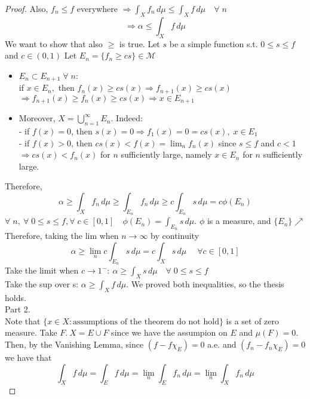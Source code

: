 \begin{proof}
    Also, \(f_n \leq f \) everywhere \(\Rightarrow \int_X f_n \, d\mu \leq \int_X f \, d\mu \quad \forall \; n\) 
    \[
        \Rightarrow \alpha \leq \int_X f \, d\mu 
    \]
    We want to show that also \(\geq \) is true. Let \(s\) be a simple function s.t. \(0 \leq s \leq f\) and \(c \in \left(0,1\right)\)
    Let \(E_n = \{f_n \geq cs\} \in \mathcal{M}\)
    \begin{itemize}
        \item \(E_n \subset E_{n+1} \; \forall \; n:\) 
        \\ if \(x \in E_n, \) then \(f_n(x) \geq cs(x) \Rightarrow f_{n+1}(x) \geq cs(x)\) \\ \(\Rightarrow f_{n+1}(x) \geq f_n(x) \geq cs(x) \Rightarrow x \in E_{n+1}\)
        \item Moreover, \(X = \bigcup_{n=1}^\infty E_n\). Indeed: 
        \\ - if \(f(x)=0\), then \(s(x)=0 \Rightarrow f_1(x)=0 = cs(x), \; x \in E_1\) 
        \\ - if \(f(x)>0\), then \(cs(x) < f(x)=\lim_n f_n(x)\) since \(s \leq f \) and \(c <1\) 
        \\ \(\Rightarrow cs(x) < f_n(x)\) for \(n \) sufficiently large, namely \(x \in E_n \) for \(n \) sufficiently large. 
    \end{itemize} 
    Therefore, 
    \[
        \alpha \geq \int_X f_n \, d\mu \geq \int_{E_n} f_n \, d\mu \geq c \int_{E_n} s \, d\mu = c \phi(E_n)
    \]
    \(\forall \; n, \ \forall \; 0 \leq s \leq f, \forall \; c \in \left[0, 1\right]\quad \phi(E_n) = \int_{E_n} s \, d\mu\). 
    \(\phi\) is a measure, and \(\{E_n\} \nearrow\) \\
    Therefore, taking the lim when \(n \to \infty\) by continuity 
    \[
        \alpha \geq \lim_n c \int_{E_n} s \, d\mu = c \int_X s \, d\mu \; \quad \forall c \in \left[0, 1\right]
    \]
    Take the limit when \(c \to 1^-: \ \alpha \geq \int_X s \, d\mu  \quad \forall \; 0 \leq s \leq f \) \\
    Take the sup over s: \(\alpha \geq \int_X f \, d\mu \).
    We proved both inequalities, so the thesis holds. \\
    Part 2. \\
    Note that \(\{x \in X: \text{assumptions of the theorem do not hold}\}\) is a set of zero measure. Take \(F. \ X = E \cup F \) since we have the assumpion on \(E\) and \(\mu (F)=0\). \\ 
    Then, by the Vanishing Lemma, since \((f - f \chi_E)=0\) a.e. and \((f_n - f_n \chi_E)=0\) we have that 
    \[ 
        \int_X f \, d\mu = \int_E f \, d\mu = \lim_n \int_E f_n \, d\mu = \lim_n \int_X f_n \, d\mu 
    \]
\end{proof}